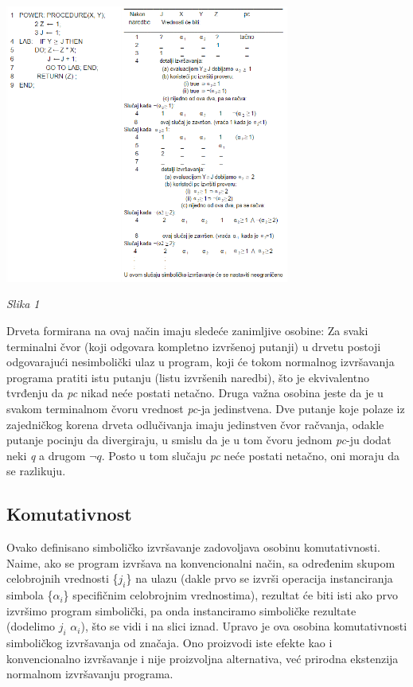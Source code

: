 \documentclass[a4paper]{article}
\begin{document}
{\includegraphics[width=0.7\textwidth]{Slika1}

\textit{Slika 1}

Drveta formirana na ovaj način imaju sledeće zanimljive osobine:
Za svaki terminalni čvor (koji odgovara kompletno izvršenoj putanji) u drvetu postoji odgovarajući nesimbolički ulaz u program, koji će tokom normalnog izvršavanja programa pratiti istu putanju (listu izvršenih naredbi), što je ekvivalentno tvrđenju  da \textit{pc} nikad neće postati netačno. Druga važna osobina jeste da je u svakom terminalnom čvoru vrednost \textit{pc}-ja jedinstvena. Dve putanje koje polaze iz zajedničkog korena drveta odlučivanja imaju jedinstven čvor račvanja, odakle putanje pocinju da divergiraju, u smislu da je u tom čvoru jednom \textit{pc}-ju dodat neki \textit{q} a drugom $\neg q$. Posto u tom slučaju \textit{pc} neće postati netačno, oni moraju da se razlikuju. 

\subsection{Komutativnost}

Ovako definisano simboličko izvršavanje zadovoljava osobinu komutativnosti. Naime, ako se program izvršava na konvencionalni način, sa određenim skupom celobrojnih vrednosti \{$j_i$\} na ulazu (dakle prvo se izvrši operacija instanciranja simbola \{$\alpha_i$\} specifičnim celobrojnim vrednostima), rezultat će biti isti ako prvo izvršimo program simbolički, pa onda instanciramo simboličke rezultate (dodelimo $j_i$ $\alpha_i$), što se vidi i na slici iznad. Upravo je ova osobina komutativnosti simboličkog izvršavanja od značaja. Ono proizvodi iste efekte kao i konvencionalno izvršavanje i nije proizvoljna alternativa, već prirodna ekstenzija normalnom izvršavanju programa.

}
\end{document}
